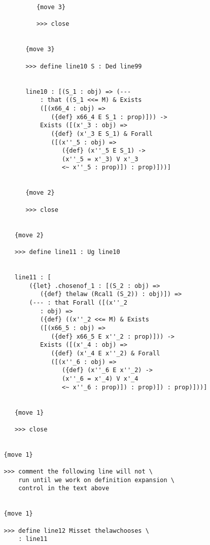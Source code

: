 \documentclass{article}
\begin{document}
\begin{verbatim}
            {move 3}

            >>> close


         {move 3}

         >>> define line10 S : Ded line99


         line10 : [(S_1 : obj) => (--- 
             : that ((S_1 <<= M) & Exists 
             ([(x66_4 : obj) => 
                ({def} x66_4 E S_1 : prop)])) -> 
             Exists ([(x'_3 : obj) => 
                ({def} (x'_3 E S_1) & Forall 
                ([(x''_5 : obj) => 
                   ({def} (x''_5 E S_1) -> 
                   (x''_5 = x'_3) V x'_3 
                   <~ x''_5 : prop)]) : prop)]))]


         {move 2}

         >>> close


      {move 2}

      >>> define line11 : Ug line10


      line11 : [
          ({let} .chosenof_1 : [(S_2 : obj) => 
             ({def} thelaw (Rcal1 (S_2)) : obj)]) => 
          (--- : that Forall ([(x''_2 
             : obj) => 
             ({def} ((x''_2 <<= M) & Exists 
             ([(x66_5 : obj) => 
                ({def} x66_5 E x''_2 : prop)])) -> 
             Exists ([(x'_4 : obj) => 
                ({def} (x'_4 E x''_2) & Forall 
                ([(x''_6 : obj) => 
                   ({def} (x''_6 E x''_2) -> 
                   (x''_6 = x'_4) V x'_4 
                   <~ x''_6 : prop)]) : prop)]) : prop)]))]


      {move 1}

      >>> close


   {move 1}

   >>> comment the following line will not \
       run until we work on definition expansion \
       control in the text above


   {move 1}

   >>> define line12 Misset thelawchooses \
       : line11



\end{verbatim}
\end{document}
